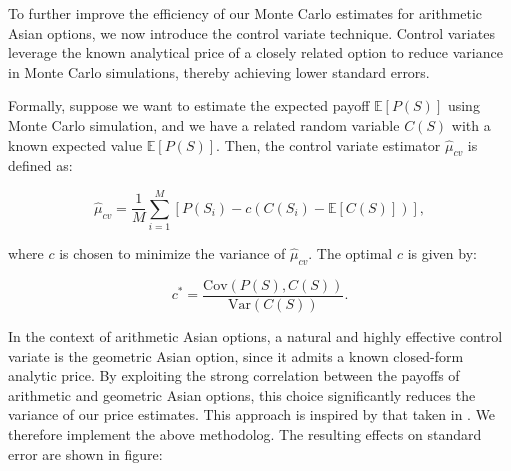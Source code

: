 To further improve the efficiency of our Monte Carlo estimates for arithmetic Asian options, we
now introduce the control variate technique. Control variates leverage the known analytical price 
of a closely related option to reduce variance in Monte Carlo simulations, thereby achieving lower 
standard errors.

Formally, suppose we want to estimate the expected payoff $\mathbb{E}[P(S)]$ using Monte Carlo 
simulation, and we have a related random variable $C(S)$ with a known expected value $\mathbb{E}[P(S)]$.
Then, the control variate estimator $\hat{\mu}_{cv}$ is defined as:

\begin{equation*}
\hat{\mu}_{cv} = \frac{1}{M} \sum_{i=1}^{M}\left[P(S_i) - c\left(C(S_i)-\mathbb{E}[C(S)]\right)\right],
\end{equation*}

where $c$ is chosen to minimize the variance of $\hat{\mu}_{cv}$. The optimal $c$ is given by:

\begin{equation*}
    c^* = \frac{\mathrm{Cov}(P(S), C(S))}{\mathrm{Var}(C(S))}.
\end{equation*}

In the context of arithmetic Asian options, a natural and highly effective control variate is
the geometric Asian option, since it admits a known closed-form analytic price. 
By exploiting the strong correlation between the payoffs of arithmetic 
and geometric Asian options, this choice significantly reduces the variance of our price estimates.
This approach is inspired by that taken in \cite{kemna1990pricing}. We therefore implement 
the above methodolog. The resulting effects on standard error are shown in figure:



